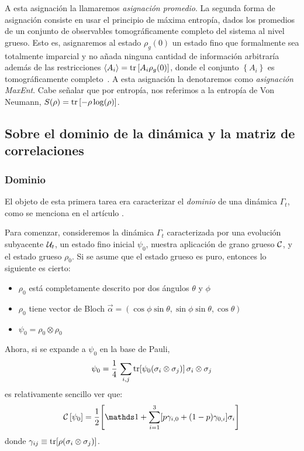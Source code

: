 A esta asignación la llamaremos \textit{asignación promedio}. La segunda forma de asignación consiste en usar el principio de máxima entropía, dados los promedios de un conjunto de observables tomográficamente completo del sistema al nivel grueso. Esto es, asignaremos al estado $\rho_g(0)$ un estado fino que formalmente sea totalmente imparcial y no añada ninguna cantidad de información arbitraría además de las restricciones $\langle A_i \rangle=\tr \left[ A_i \rho_g(0) \right]$, donde el conjunto $\left\{A_i \right\}$ es tomográficamente completo~\cite{jaynes}. A esta asignación la denotaremos como \textit{asignación MaxEnt}. Cabe señalar que por entropía, nos referimos a la entropía de Von Neumann, $S(\rho)=\tr \left[ -\rho \log(\rho) \right]$.

\subsection{Sobre el dominio de la dinámica y la matriz de correlaciones}

\subsubsection{Dominio}

El objeto de esta primera tarea era caracterizar el \textit{dominio} de una dinámica $\Gamma_{t}$, como se menciona en el artículo \cite{CGEmergingDynamics}.

Para comenzar, consideremos la dinámica  $\Gamma_{t}$ caracterizada por una evolución subyacente $\mathcal{U}_{
t}$, un estado fino inicial $\psi_{0}$, nuestra aplicación de grano grueso $\mathcal{C}$, y el estado grueso $\rho_{0}$. Si se asume que el estado grueso es puro, entonces lo siguiente es cierto:
\begin{itemize}
\item $\rho_{0}$ está completamente descrito por dos ángulos $\theta$ y $\phi$
\item $\rho_{0}$ tiene vector de Bloch $\vec{\alpha}=(\cos{\phi}\sin{\theta},\sin{\phi}\sin{\theta},\cos{\theta})$
\item $\psi_{0}=\rho_{0}\otimes\rho_{0}$
\end{itemize}
Ahora, si se expande a $\psi_{0}$ en la base de Pauli,
\begin{equation}
    \psi_{0} = \frac{1}{4}\,\sum_{i,j} \tr[\psi_{0}(\sigma_i \otimes \sigma_j)]\, \sigma_i\otimes\sigma_j
\end{equation}
es relativamente sencillo ver que:
\begin{equation}
    \CG{\psi_{0}} = \frac{1}{2}\qty[\Id + \sum_{i=1}^3[p\gamma_{i,0}+(1-p)\gamma_{0,i}]\sigma_i]
\end{equation}
donde $\gamma_{ij} \equiv \tr[\rho(\sigma_i \otimes\sigma_j)]$. 

